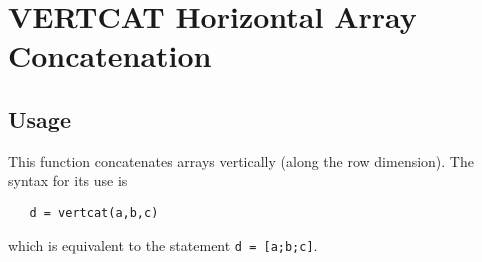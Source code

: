 \section{VERTCAT Horizontal Array Concatenation}

\subsection{Usage}

This function concatenates arrays vertically (along the row
dimension).  The syntax for its use is
\begin{verbatim}
   d = vertcat(a,b,c)
\end{verbatim}
which is equivalent to the statement \verb|d = [a;b;c]|.
